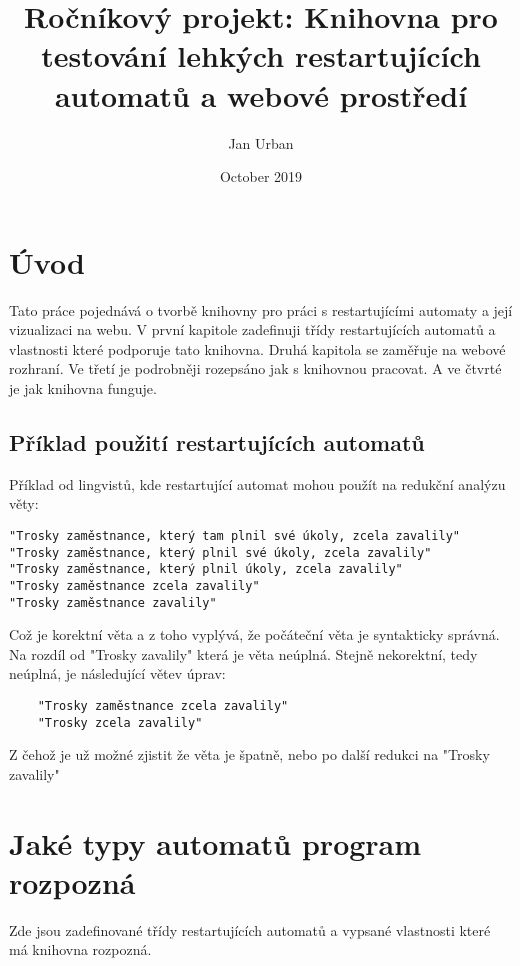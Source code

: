 \documentclass{article}
\title{ Ročníkový projekt: Knihovna pro testování lehkých restartujících automatů a webové prostředí}
\author{Jan Urban }
\date{October 2019}
\begin{document}
\maketitle

\newpage

\tableofcontents

\newpage

\section*{Úvod}

Tato práce pojednává o tvorbě knihovny pro práci s restartujícími automaty a její vizualizaci na webu.
V první kapitole zadefinuji třídy restartujících automatů a vlastnosti které podporuje tato knihovna.
Druhá kapitola se zaměřuje na webové rozhraní.
Ve třetí je podrobněji rozepsáno jak s knihovnou pracovat.
A ve čtvrté je jak knihovna funguje.

\subsection{Příklad použití restartujících automatů}
Příklad od lingvistů, kde restartující automat mohou použít na redukční analýzu věty:

\begin{verbatim}
"Trosky zaměstnance, který tam plnil své úkoly, zcela zavalily"
"Trosky zaměstnance, který plnil své úkoly, zcela zavalily"
"Trosky zaměstnance, který plnil úkoly, zcela zavalily"
"Trosky zaměstnance zcela zavalily"
"Trosky zaměstnance zavalily"
\end{verbatim}

Což je korektní věta a z toho vyplývá, že počáteční věta je syntakticky správná.
Na rozdíl od "Trosky zavalily" která je věta neúplná.
Stejně nekorektní, tedy neúplná, je následující větev úprav:

\begin{verbatim}
	"Trosky zaměstnance zcela zavalily"
	"Trosky zcela zavalily"
\end{verbatim}

Z čehož je už možné zjistit že věta je špatně, nebo po další redukci na "Trosky zavalily"

\section{Jaké typy automatů program rozpozná}
Zde jsou zadefinované třídy restartujících automatů a vypsané vlastnosti které má knihovna rozpozná.
\end{document}
